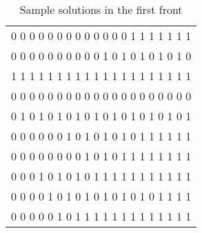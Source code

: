 \begin{table}[h!]
\centering
\begin{tabular}{l}
0	0	0	0	0	0	0	0	0	0	0	0	0	1	1	1	1	1	1	1 \\
0	0	0	0	0	0	0	0	0	0	1	0	1	0	1	0	1	0	1	0 \\
1	1	1	1	1	1	1	1	1	1	1	1	1	1	1	1	1	1	1	1 \\
0	0	0	0	0	0	0	0	0	0	0	0	0	0	0	0	0	0	0	0 \\
0	1	0	1	0	1	0	1	0	1	0	1	0	1	0	1	0	1	0	1 \\
0	0	0	0	0	0	1	0	1	0	1	0	1	0	1	1	1	1	1	1 \\
0	0	0	0	0	0	0	0	1	0	1	0	1	1	1	1	1	1	1	1 \\
0	0	0	1	0	1	0	1	0	1	1	1	1	1	1	1	1	1	1	1 \\
0	0	0	0	1	0	1	0	1	0	1	0	1	0	1	0	1	1	1	1 \\
0	0	0	0	0	1	0	1	1	1	1	1	1	1	1	1	1	1	1	1 \\
\end{tabular}
\caption{Sample solutions in the first front}
\end{table}
